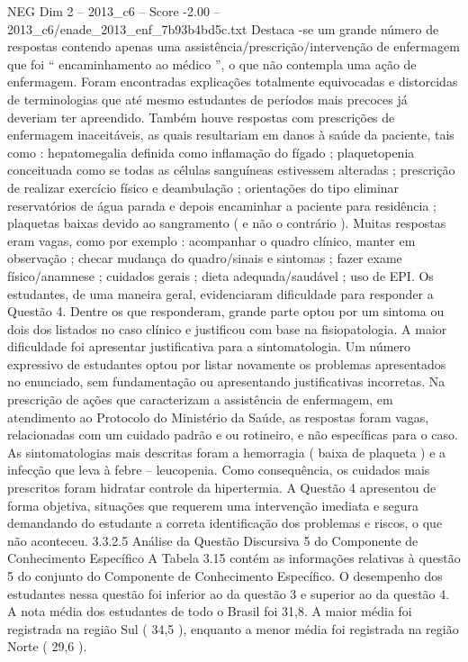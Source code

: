 \begin{textsample}{NEG Dim 2 – 2013\_c6 – Score -2.00 – 2013\_c6/enade\_2013\_enf\_7b93b4bd5c.txt}
Destaca -se um grande número de respostas contendo apenas uma assistência/prescrição/intervenção de enfermagem que foi “ encaminhamento ao médico ”, o que não contempla uma ação de enfermagem.
Foram encontradas explicações totalmente equivocadas e distorcidas de terminologias que até mesmo estudantes de períodos mais precoces já deveriam ter apreendido.
Também houve respostas com prescrições de enfermagem inaceitáveis, as quais resultariam em danos à saúde da paciente, tais como : hepatomegalia definida como inflamação do fígado ; plaquetopenia conceituada como se todas as células sanguíneas estivessem alteradas ; prescrição de realizar exercício físico e deambulação ; orientações do tipo eliminar reservatórios de água parada e depois encaminhar a paciente para residência ; plaquetas baixas devido ao sangramento ( e não o contrário ).
Muitas respostas eram vagas, como por exemplo : acompanhar o quadro clínico, manter em observação ; checar mudança do quadro/sinais e sintomas ; fazer exame físico/anamnese ; cuidados gerais ; dieta adequada/saudável ; uso de EPI.
Os estudantes, de uma maneira geral, evidenciaram dificuldade para responder a Questão 4.
Dentre os que responderam, grande parte optou por um sintoma ou dois dos listados no caso clínico e justificou com base na fisiopatologia.
A maior dificuldade foi apresentar justificativa para a sintomatologia.
Um número expressivo de estudantes optou por listar novamente os problemas apresentados no enunciado, sem fundamentação ou apresentando justificativas incorretas.
Na prescrição de ações que caracterizam a assistência de enfermagem, em atendimento ao Protocolo do Ministério da Saúde, as respostas foram vagas, relacionadas com um cuidado padrão e ou rotineiro, e não específicas para o caso.
As sintomatologias mais descritas foram a hemorragia ( baixa de plaqueta ) e a infecção que leva à febre – leucopenia.
Como consequência, os cuidados mais prescritos foram hidratar controle da hipertermia.
A Questão 4 apresentou de forma objetiva, situações que requerem uma intervenção imediata e segura demandando do estudante a correta identificação dos problemas e riscos, o que não aconteceu. 3.3.2.5 Análise da Questão Discursiva 5 do Componente de Conhecimento Específico A Tabela 3.15 contém as informações relativas à questão 5 do conjunto do Componente de Conhecimento Específico.
O desempenho dos estudantes nessa questão foi inferior ao da questão 3 e superior ao da questão 4.
A nota média dos estudantes de todo o Brasil foi 31,8.
A maior média foi registrada na região Sul ( 34,5 ), enquanto a menor média foi registrada na região Norte ( 29,6 ).

\end{textsample}
